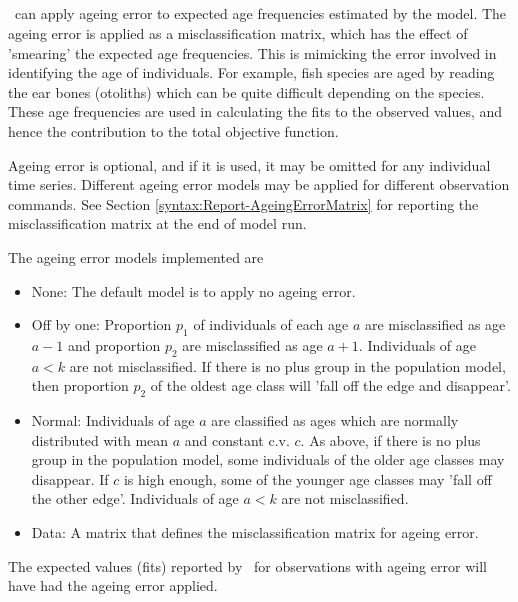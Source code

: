 \ifAgeBased
\subsection{}\label{sec:AgeingError}

\CNAME\ can apply ageing error to expected age frequencies estimated by the model. The ageing error is applied as a misclassification matrix, which has the effect of 'smearing' the expected age frequencies. This is mimicking the error involved in identifying the age of individuals. For example, fish species are aged by reading the ear bones (otoliths) which can be quite difficult depending on the species. These age frequencies are used in calculating the fits to the observed values, and hence the contribution to the total objective function.

Ageing error is optional, and if it is used, it may be omitted for any individual time series. Different ageing error models may be applied for different observation commands. See Section \ref{syntax:Report-AgeingErrorMatrix} for reporting the misclassification matrix at the end of model run.

The ageing error models implemented are

\begin{itemize}
  \item{None}: The default model is to apply no ageing error.\label{sec:AgeingError-None}
  \item{Off by one}: Proportion $p_1$ of individuals of each age $a$ are misclassified as age $a-1$ and proportion $p_2$ are misclassified as age $a+1$. Individuals of age $a < k$ are not misclassified. If there is no plus group in the population model, then proportion $p_2$ of the oldest age class will 'fall off the edge and disappear'.\label{sec:AgeingError-OffByOne}
  \item{Normal}: Individuals of age $a$ are classified as ages which are normally distributed with mean $a$ and constant c.v. $c$. As above, if there is no plus group in the population model, some individuals of the older age classes may disappear. If $c$ is high enough, some of the younger age classes may 'fall off the other edge'. Individuals of age $a < k$ are not misclassified.\label{sec:AgeingError-Normal}
  \item{Data}: A matrix that defines the misclassification matrix for ageing error\label{sec:AgeingError-Data}.
\end{itemize}

The expected values (fits) reported by \CNAME\ for observations with ageing error will have had the ageing error applied.
\fi

